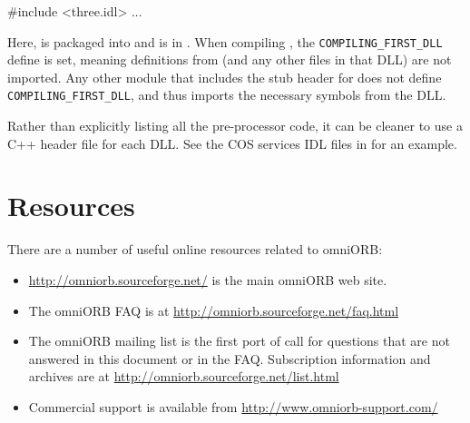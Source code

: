 \documentclass[11pt,oneside,a4paper]{book}
\newcommand{\code}[1]{\texttt{#1}}
\begin{document}
\begin{enumerate}
\begin{idllisting}
#include <three.idl>
...
\end{idllisting}

      Here,  is packaged into  and
       is in . When compiling
      , the \code{COMPILING\_FIRST\_DLL} define is
      set, meaning definitions from  (and any other
      files in that DLL) are not imported. Any other module that
      includes the stub header for  does not define
      \code{COMPILING\_FIRST\_DLL}, and thus imports the necessary
      symbols from the DLL.

      Rather than explicitly listing all the pre-processor code, it
      can be cleaner to use a C++ header file for each DLL. See the
      COS services IDL files in  for an example.

\end{enumerate}



\chapter{Resources}

There are a number of useful online resources related to omniORB:

\begin{itemize}

\item \url{http://omniorb.sourceforge.net/} is the main omniORB web
  site.

\item The omniORB FAQ is at \url{http://omniorb.sourceforge.net/faq.html}

\item The omniORB mailing list is the first port of call for questions
  that are not answered in this document or in the FAQ. Subscription
  information and archives are at
  \url{http://omniorb.sourceforge.net/list.html}

\item Commercial support is available from
  \url{http://www.omniorb-support.com/}

\end{itemize}


\backmatter


\end{document}
